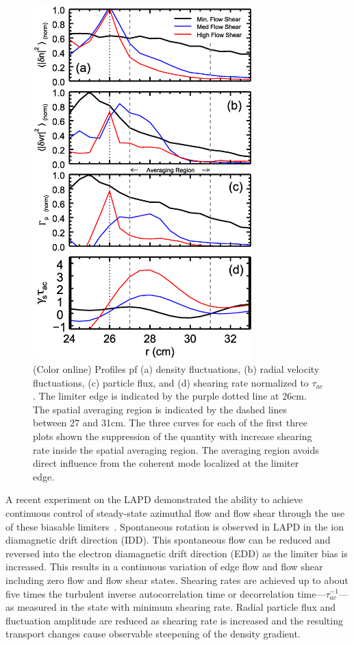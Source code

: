 \documentclass[aip,pop,amsmath,amssymb,peprint,superscriptaddress]{revtex4-1} %
\begin{document}
\begin{figure}[!htbp]
\centerline{
\includegraphics[width=8.5cm]{figure3.eps}}
\caption{\label{fig:profiles} (Color online) Profiles pf (a) density fluctuations, (b) radial velocity fluctuations, (c) particle flux, and (d) shearing rate normalized to $\tau_{ac}$. The limiter edge is indicated by the purple dotted line at 26cm. The spatial averaging region is indicated by the dashed lines between 27 and 31cm. The three curves for each of the first three plots shown the suppression of the quantity with increase shearing rate inside the spatial averaging region. The averaging region avoids direct influence from the coherent mode localized at the limiter edge.}
\end{figure}

A recent experiment on the LAPD demonstrated the ability to achieve
continuous control of steady-state azimuthal flow and flow shear
through the use of these biasable
limiters~\cite{schaffner12}. Spontaneous rotation is observed in LAPD
in the ion diamagnetic drift direction (IDD).  This spontaneous flow can be
reduced and reversed into the electron diamagnetic drift direction (EDD) as the
limiter bias is increased. This results in a continuous variation of
edge flow and flow shear including zero flow and flow shear
states. Shearing rates are achieved up to about five times the
turbulent inverse autocorrelation time or decorrelation time---$\tau_{ac}^{-1}$---as measured
in the state with minimum shearing rate. Radial particle flux and
fluctuation amplitude are reduced as shearing rate is increased and
the resulting transport changes cause observable steepening of the
density gradient.
\end{document}
